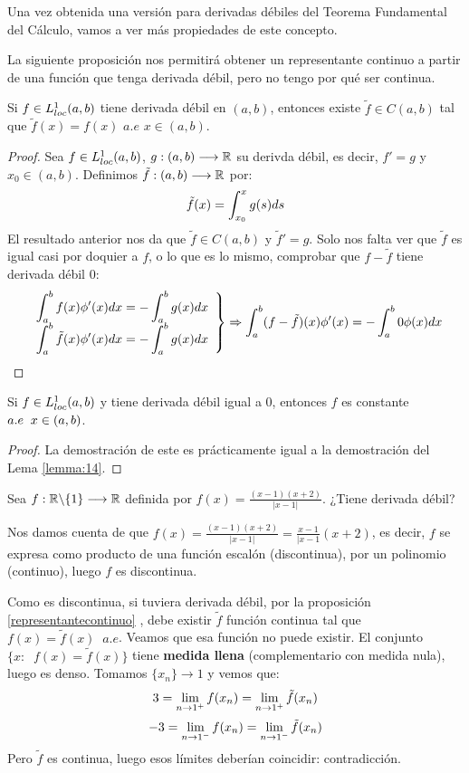 Una vez obtenida una versión para derivadas débiles del Teorema Fundamental del Cálculo, vamos a ver más propiedades de este concepto.

La siguiente proposición nos permitirá obtener un representante continuo a partir de una función que tenga derivada débil, pero no tengo por qué ser continua.

\begin{prop}
\label{representantecontinuo}
Si $f\in L^1_{loc}(a,b)$ tiene derivada débil en $(a,b)$, entonces existe $\tilde{f}\in C(a,b)$ tal que $\tilde{f}(x)=f(x)$ $a.e$ $x\in(a,b)$.
\end{prop}

\begin{proof}
Sea $f\in L^1_{loc}(a,b)$, $g : (a,b) \longrightarrow \mathbb{R}$ su derivda débil, es decir, $f'=g$ y $x_0\in(a,b)$. Definimos $\tilde{f} : (a,b) \longrightarrow \mathbb{R}$ por:
\[
\tilde{f}(x)=\displaystyle\int_{ x_0 }^{ x } g(s)ds
\]
El resultado anterior nos da que $\tilde{f}\in C(a,b)$ y $\tilde{f}'=g$. Solo nos falta ver que $\tilde{f}$ es igual casi por doquier a $f$, o lo que es lo mismo, comprobar que $f-\tilde{f}$ tiene derivada débil 0:
\[
\left.
\begin{array}{cc}
\displaystyle\int_{ a }^{ b } f(x)\phi'(x)dx=-\displaystyle\int_{ a }^{ b } g(x)dx \\
\displaystyle\int_{ a }^{ b } \tilde{f}(x)\phi'(x)dx=-\displaystyle\int_{ a }^{ b } g(x)dx
\end{array}
\right\} \Rightarrow \displaystyle\int_{ a }^{ b } (f-\tilde{f})(x)\phi'(x)=-\displaystyle\int_{ a }^{ b } 0\phi(x)dx
\]
\end{proof}

\begin{prop}
Si $f\in L^1_{loc}(a,b)$ y tiene derivada débil igual a 0, entonces $f$ es constante $a.e \;\; x\in(a,b)$.
\end{prop}

\begin{proof}
La demostración de este es prácticamente igual a la demostración del Lema \ref{lemma:14}.
\end{proof}

\begin{example}[examen 18/19]
Sea $f : \mathbb{R}\backslash\{1\} \longrightarrow \mathbb{R}$ definida por $f(x)=\frac{(x-1)(x+2)}{|x-1|}$. ¿Tiene derivada débil?

Nos damos cuenta de que $f(x)=\frac{(x-1)(x+2)}{|x-1|}=\frac{x-1}{|x-1}(x+2)$, es decir, $f$ se expresa como producto de una función escalón (discontinua), por un polinomio (continuo), luego $f$ es discontinua.

Como es discontinua, si tuviera derivada débil, por la proposición \ref{representantecontinuo} , debe existir $\tilde{f}$ función continua tal que $f(x)=\tilde{f}(x)\;\; a.e$. Veamos que esa función no puede existir. El conjunto $\{x:\;\; f(x)=\tilde{f}(x)\}$ tiene \textbf{medida llena} (complementario con medida nula), luego es denso. Tomamos $\{x_n\}\longrightarrow 1$ y vemos que:
\[
3=\displaystyle\lim_{ n \to 1^+ } f(x_n)=\displaystyle\lim_{ n \to 1^+ } \tilde{f}(x_n)
\]
\[
-3=\displaystyle\lim_{ n \to 1^- } f(x_n)=\displaystyle\lim_{ n \to 1^- } \tilde{f}(x_n)
\]
Pero $\tilde{f}$ es continua, luego esos límites deberían coincidir: contradicción.

\end{example}

